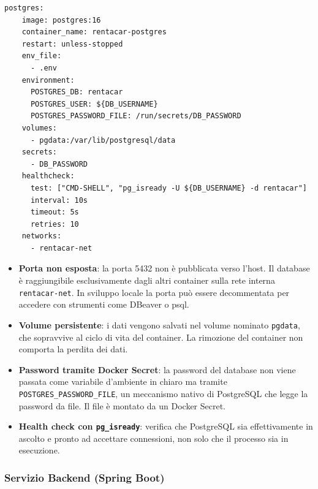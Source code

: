 \documentclass[12pt, a4paper]{article}
\begin{document}
    \begin{lstlisting}[language={}, caption={docker-compose.yml — servizio postgres}]
  postgres:
    image: postgres:16
    container_name: rentacar-postgres
    restart: unless-stopped
    env_file:
      - .env
    environment:
      POSTGRES_DB: rentacar
      POSTGRES_USER: ${DB_USERNAME}
      POSTGRES_PASSWORD_FILE: /run/secrets/DB_PASSWORD
    volumes:
      - pgdata:/var/lib/postgresql/data
    secrets:
      - DB_PASSWORD
    healthcheck:
      test: ["CMD-SHELL", "pg_isready -U ${DB_USERNAME} -d rentacar"]
      interval: 10s
      timeout: 5s
      retries: 10
    networks:
      - rentacar-net
    \end{lstlisting}

    \begin{itemize}
        \item \textbf{Porta non esposta}: la porta 5432 non è pubblicata verso l'host.
        Il database è raggiungibile esclusivamente dagli altri container sulla rete interna
        \texttt{rentacar-net}. In sviluppo locale la porta può essere decommentata per
        accedere con strumenti come DBeaver o psql.

        \item \textbf{Volume persistente}: i dati vengono salvati nel volume nominato
        \texttt{pgdata}, che sopravvive al ciclo di vita del container. La rimozione del
        container non comporta la perdita dei dati.

        \item \textbf{Password tramite Docker Secret}: la password del database non viene
        passata come variabile d'ambiente in chiaro ma tramite \texttt{POSTGRES\_PASSWORD\_FILE},
        un meccanismo nativo di PostgreSQL che legge la password da file. Il file è montato
        da un Docker Secret.

        \item \textbf{Health check con \texttt{pg\_isready}}: verifica che PostgreSQL sia
        effettivamente in ascolto e pronto ad accettare connessioni, non solo che il processo
        sia in esecuzione.
    \end{itemize}

    \subsubsection{Servizio Backend (Spring Boot)}
\end{document}
